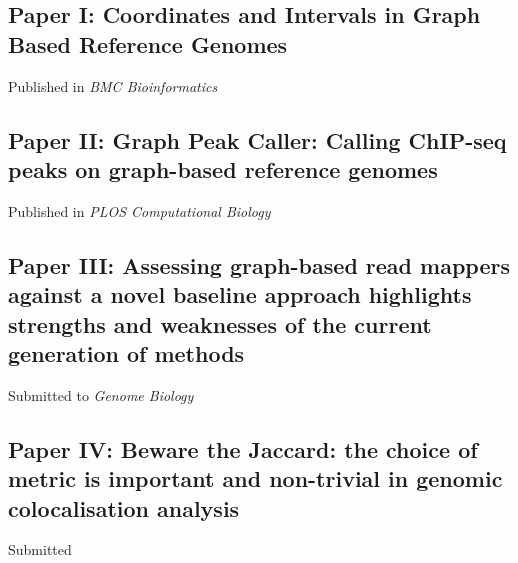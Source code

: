 \subsection{Paper I: Coordinates and Intervals in Graph Based Reference Genomes}
Published in \emph{BMC Bioinformatics}
\subsection{Paper II: Graph Peak Caller: Calling ChIP-seq peaks on graph-based reference genomes}
Published in \emph{PLOS Computational Biology}
\subsection{Paper III: Assessing graph-based read mappers against a novel baseline approach highlights strengths and weaknesses of the current generation of methods}
Submitted to \emph{Genome Biology}
\subsection{Paper IV: Beware the Jaccard: the choice of metric is important and non-trivial in genomic colocalisation analysis}
Submitted
